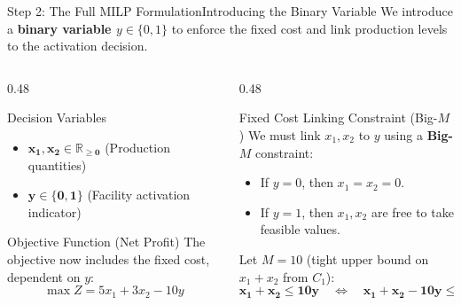 \documentclass[aspectratio=169]{beamer}
\begin{document}
\begin{frame}{Step 2: The Full MILP Formulation}{Introducing the Binary Variable}
    We introduce a \textbf{binary variable $y \in \{0, 1\}$} to enforce the fixed cost and link production levels to the activation decision.

    \begin{columns}[T]
        \begin{column}{0.48\textwidth}
            \begin{block}{Decision Variables}
                \begin{itemize}
                    \item $\mathbf{x_1, x_2 \in \mathbb{R}_{\ge 0}}$ (Production quantities)
                    \item $\mathbf{y \in \{0, 1\}}$ (Facility activation indicator)
                \end{itemize}
            \end{block}

            \begin{block}{Objective Function (Net Profit)}
                The objective now includes the fixed cost, dependent on $y$:
                \[ \max Z = 5x_1 + 3x_2 - 10y \]
            \end{block}
        \end{column}
        \begin{column}{0.48\textwidth}
            \begin{block}{Fixed Cost Linking Constraint (Big-$M$)}
                We must link $x_1, x_2$ to $y$ using a \textbf{Big-$M$} constraint:
                \begin{itemize}
                    \item If $y=0$, then $x_1=x_2=0$.
                    \item If $y=1$, then $x_1, x_2$ are free to take feasible values.
                \end{itemize}
                Let $M=10$ (tight upper bound on $x_1+x_2$ from $C_1$):
                \[ \mathbf{x_1 + x_2 \le 10y} \quad \Longleftrightarrow \quad \mathbf{x_1 + x_2 - 10y \le 0} \]
            \end{block}
        \end{column}
    \end{columns}
\end{frame}
\end{document}
